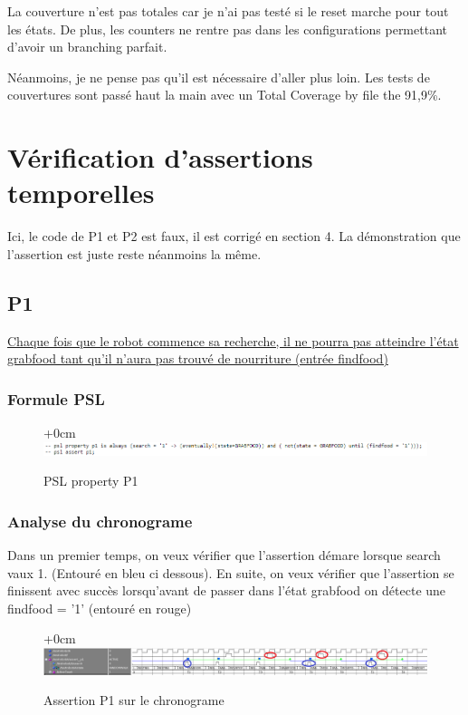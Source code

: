 \documentclass{article}
\newcommand{\sautligne}{
\textbf{\vspace{5mm}}
}
\begin{document}
La couverture n'est pas totales car je n'ai pas testé si le reset marche pour tout les états. De plus, les counters ne rentre pas dans les configurations permettant d'avoir un branching parfait. 
\sautligne 

Néanmoins, je ne pense pas qu'il est nécessaire d'aller plus loin. Les tests de couvertures sont passé haut la main avec un Total Coverage by file the 91,9\%.

\newpage



\section{Vérification d'assertions temporelles}

Ici, le code de P1 et P2 est faux, il est corrigé en section 4. La démonstration que l'assertion est juste reste néanmoins la même.

\subsection{P1}
\uline{Chaque fois que le robot commence sa recherche, il ne pourra pas atteindre l'état 
grabfood tant qu'il n'aura pas trouvé de nourriture (entrée findfood)}

\subsubsection{Formule PSL }
\begin{figure}[!h]
\advance\leftskip+0cm
\includegraphics[scale=0.7]{PSL/P1.PNG}
\caption{PSL property P1}
\end{figure}

\subsubsection{Analyse du chronograme}
Dans un premier temps, on veux vérifier que l'assertion démare lorsque search vaux 1. (Entouré en bleu ci dessous). 
En suite, on veux vérifier que l'assertion se finissent avec succès lorsqu'avant de passer dans l'état grabfood on détecte une findfood = '1' (entouré en rouge)

\begin{figure}[!h]
\advance\leftskip+0cm
\includegraphics[scale=0.6]{PSL/P1-1.PNG}
\caption{Assertion P1 sur le chronograme }
\end{figure}
\end{document}
